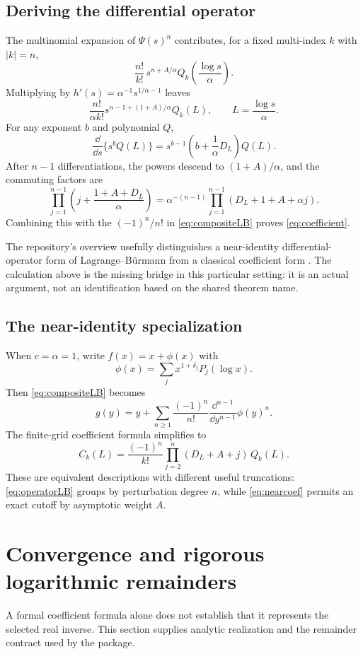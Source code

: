\documentclass[11pt,a4paper]{article}
\numberwithin{equation}{section}
\theoremstyle{definition}\newtheorem{definition}[theorem]{Definition}
\theoremstyle{remark}\newtheorem{remark}[theorem]{Remark}
\begin{document}
\subsection{Deriving the differential operator}
The multinomial expansion of $\Psi(s)^n$ contributes, for a fixed multi-index $k$ with $|k|=n$,
\[
\frac{n!}{k!}\,s^{n+A/\alpha}Q_k\!\left(\frac{\log s}{\alpha}\right).
\]
Multiplying by $h'(s)=\alpha^{-1}s^{1/\alpha-1}$ leaves
\[
\frac{n!}{\alpha k!}
 s^{n-1+(1+A)/\alpha}Q_k(L),\qquad L=\frac{\log s}{\alpha}.
\]
For any exponent $b$ and polynomial $Q$,
\begin{equation}\label{eq:diffblock}
\frac\dd{\dd s}\{s^bQ(L)\}
=s^{b-1}\left(b+\frac1\alpha D_L\right)Q(L).
\end{equation}
After $n-1$ differentiations, the powers descend to $(1+A)/\alpha$, and the commuting factors are
\[
\prod_{j=1}^{n-1}\left(j+\frac{1+A+D_L}{\alpha}\right)
=\alpha^{-(n-1)}\prod_{j=1}^{n-1}(D_L+1+A+\alpha j).
\]
Combining this with the $(-1)^n/n!$ in \eqref{eq:compositeLB} proves \eqref{eq:coefficient}.

The repository's overview usefully distinguishes a near-identity differential-operator form of Lagrange--B\"urmann from a classical coefficient form \cite{repo}. The calculation above is the missing bridge in this particular setting: it is an actual argument, not an identification based on the shared theorem name.

\subsection{The near-identity specialization}
When $c=\alpha=1$, write $f(x)=x+\phi(x)$ with
\[
\phi(x)=\sum_j x^{1+\delta_j}P_j(\log x).
\]
Then \eqref{eq:compositeLB} becomes
\begin{equation}\label{eq:operatorLB}
g(y)=y+\sum_{n\ge1}\frac{(-1)^n}{n!}
\frac{\dd^{n-1}}{\dd y^{n-1}}\phi(y)^n.
\end{equation}
The finite-grid coefficient formula simplifies to
\begin{equation}\label{eq:nearcoef}
C_k(L)=\frac{(-1)^n}{k!}
\prod_{j=2}^{n}(D_L+A+j)\,Q_k(L).
\end{equation}
These are equivalent descriptions with different useful truncations: \eqref{eq:operatorLB} groups by perturbation degree $n$, while \eqref{eq:nearcoef} permits an exact cutoff by asymptotic weight $A$.

\section{Convergence and rigorous logarithmic remainders}
\label{sec:remainder}
A formal coefficient formula alone does not establish that it represents the selected real inverse. This section supplies analytic realization and the remainder contract used by the package.
\end{document}
